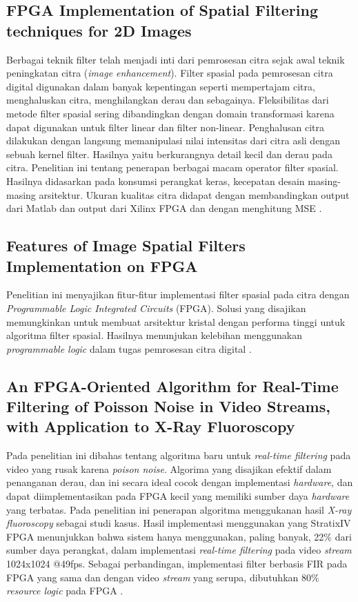 \subsection{FPGA Implementation of Spatial Filtering techniques for 2D Images}
Berbagai teknik filter telah menjadi inti dari pemrosesan citra sejak awal teknik peningkatan citra (\textit{image enhancement}). Filter spasial pada pemrosesan citra digital digunakan dalam banyak kepentingan seperti mempertajam citra, menghaluskan citra, menghilangkan derau dan sebagainya. Fleksibilitas dari metode filter spasial sering dibandingkan dengan domain transformasi karena dapat digunakan untuk filter linear dan filter non-linear. Penghalusan citra dilakukan dengan langsung memanipulasi nilai intensitas dari citra asli dengan sebuah kernel filter. Hasilnya yaitu berkurangnya detail kecil dan derau pada citra. Penelitian ini tentang penerapan berbagai macam operator filter spasial. Hasilnya didasarkan pada konsumsi perangkat keras, kecepatan desain masing-masing arsitektur. Ukuran kualitas citra didapat dengan membandingkan output dari Matlab dan output dari Xilinx FPGA dan dengan menghitung MSE .

\subsection{Features of Image Spatial Filters Implementation on FPGA}
Penelitian ini menyajikan fitur-fitur implementasi filter spasial pada citra dengan \textit{Programmable Logic Integrated Circuits} (FPGA). Solusi yang disajikan memungkinkan untuk membuat arsitektur kristal dengan performa tinggi untuk algoritma filter spasial. Hasilnya menunjukan kelebihan menggunakan \textit{programmable logic} dalam tugas pemrosesan citra digital .

\subsection{An FPGA-Oriented Algorithm for Real-Time Filtering of Poisson Noise in Video Streams, with Application to X-Ray Fluoroscopy}
Pada penelitian ini dibahas tentang algoritma baru untuk \textit{real-time filtering} pada video yang rusak karena \textit{poison noise}. Algorima yang disajikan efektif dalam penanganan derau, dan ini secara ideal cocok dengan implementasi \textit{hardware}, dan dapat diimplementasikan pada FPGA kecil yang memiliki sumber daya \textit{hardware} yang terbatas. Pada penelitian ini penerapan algoritma menggukanan hasil \textit{X-ray fluoroscopy} sebagai studi kasus. Hasil implementasi menggunakan yang StratixIV FPGA menunjukkan bahwa sistem hanya menggunakan, paling banyak, 22\% dari sumber daya perangkat, dalam implementasi \textit{real-time filtering} pada video \textit{stream} 1024x1024 @49fps. Sebagai perbandingan, implementasi filter berbasis FIR pada FPGA yang sama dan dengan video \textit{stream} yang serupa, dibutuhkan 80\% \textit{resource logic} pada FPGA .

